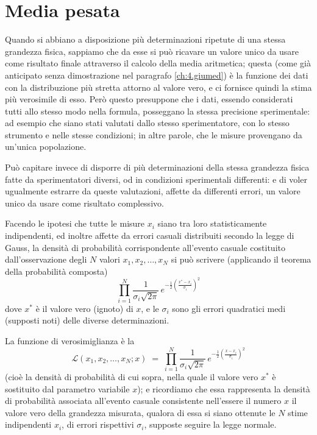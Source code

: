 \section{Media pesata}%
\label{ch:11.mepeted}
Quando si abbiano a disposizione pi\`u determinazioni
ripetute di una stessa grandezza fisica, sappiamo che da
esse si pu\`o ricavare un valore unico da usare come
risultato finale attraverso il calcolo della media
aritmetica; questa (come gi\`a anticipato senza
dimostrazione nel paragrafo \ref{ch:4.giumed}) \`e la
funzione dei dati con la distribuzione pi\`u stretta attorno
al valore vero, e ci fornisce quindi la stima pi\`u
verosimile di esso.  Per\`o questo presuppone che i dati,
essendo considerati tutti allo stesso modo nella formula,
posseggano la stessa precisione sperimentale: ad esempio che
siano stati valutati dallo stesso sperimentatore, con lo
stesso strumento e nelle stesse condizioni; in altre parole,
che le misure provengano da un'unica popolazione.

Pu\`o capitare invece di disporre di pi\`u determinazioni
della stessa grandezza fisica fatte da sperimentatori
diversi, od in condizioni sperimentali differenti: e di
voler ugualmente estrarre da queste valutazioni, affette da
differenti errori, un valore unico da usare come risultato
complessivo.

Facendo le ipotesi che tutte le misure $x_i$ siano tra loro
statisticamente indipendenti, ed inoltre affette da errori
casuali distribuiti secondo la legge di Gauss, la densit\`a
di probabilit\`a corrispondente all'evento casuale
costituito dall'osservazione degli $N$ valori $x_1,
x_2,\ldots, x_N$ si pu\`o scrivere (applicando il teorema
della probabilit\`a composta)
\begin{equation*}
  \prod_{i=1}^N \frac{1}{\sigma_i \sqrt{2 \pi}}
    \, e^{- \frac{1}{2} \left( \frac{x^*
    - x_i}{\sigma_i} \right) ^2}
\end{equation*}
dove $x^*$ \`e il valore vero (ignoto) di $x$, e le
$\sigma_i$ sono gli errori quadratici medi (supposti noti)
delle diverse determinazioni.

La funzione di verosimiglianza \`e la
\begin{equation*}
  \mathcal{L} (x_1, x_2,\ldots, x_N ; x) \; = \;
    \prod_{i=1}^N \frac{1}{\sigma_i \sqrt{2 \pi}}
    \, e^{- \frac{1}{2} \left( \frac{x -
    x_i}{\sigma_i} \right) ^2}
\end{equation*}
(cio\`e la densit\`a di probabilit\`a di cui sopra, nella
quale il valore vero $x^*$ \`e sostituito dal parametro
variabile $x$); e ricordiamo che essa rappresenta la
densit\`a di probabilit\`a associata all'evento casuale
consistente nell'essere il numero $x$ il valore vero della
grandezza misurata, qualora di essa si siano ottenute le $N$
stime indipendenti $x_i$, di errori rispettivi $\sigma_i$,
supposte seguire la legge normale.

